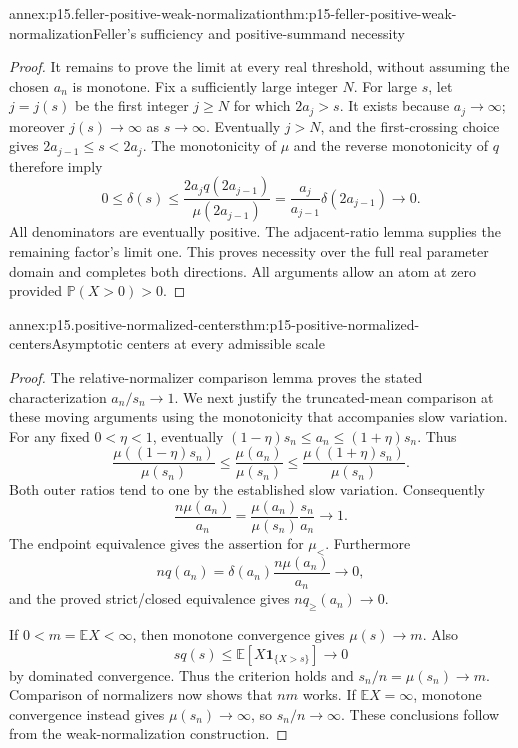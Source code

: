 \begin{annexitem}{annex:p15.feller-positive-weak-normalization}{thm:p15-feller-positive-weak-normalization}{Feller's sufficiency and positive-summand necessity}
\begin{proof}
It remains to prove the limit at every real threshold, without
assuming the chosen \(a_n\) is monotone. Fix a sufficiently large
integer \(N\). For large \(s\), let \(j=j(s)\) be the first
integer \(j\geq N\) for which \(2a_j>s\).
It exists because \(a_j\to\infty\); moreover \(j(s)\to\infty\)
as \(s\to\infty\). Eventually \(j>N\), and the first-crossing
choice gives \(2a_{j-1}\leq s<2a_j\).
The monotonicity of \(\mu\) and the reverse monotonicity of \(q\)
therefore imply
\[
 0\leq\delta(s)
 \leq\frac{2a_j q(2a_{j-1})}{\mu(2a_{j-1})}
 =\frac{a_j}{a_{j-1}}\delta(2a_{j-1})\longrightarrow0.
\]
All denominators are eventually positive. The adjacent-ratio
lemma supplies the remaining factor's limit one. This proves
necessity over the full real parameter domain and completes both
directions. All arguments allow an atom at zero provided
\(\mathbb P(X>0)>0\).
\end{proof}
\end{annexitem}

\begin{annexitem}{annex:p15.positive-normalized-centers}{thm:p15-positive-normalized-centers}{Asymptotic centers at every admissible scale}
\begin{proof}
The relative-normalizer comparison lemma proves the stated
characterization \(a_n/s_n\to1\).
We next justify the truncated-mean comparison at these moving
arguments using the monotonicity that accompanies slow variation.
For any fixed \(0<\eta<1\), eventually
\((1-\eta)s_n\leq a_n\leq(1+\eta)s_n\).
Thus
\[
 \frac{\mu((1-\eta)s_n)}{\mu(s_n)}
 \leq\frac{\mu(a_n)}{\mu(s_n)}
 \leq\frac{\mu((1+\eta)s_n)}{\mu(s_n)}.
\]
Both outer ratios tend to one by the established slow variation.
Consequently
\[
 \frac{n\mu(a_n)}{a_n}
 =\frac{\mu(a_n)}{\mu(s_n)}\frac{s_n}{a_n}\longrightarrow1.
\]
The endpoint equivalence gives the assertion for \(\mu_<\).
Furthermore
\[
 nq(a_n)=\delta(a_n)\frac{n\mu(a_n)}{a_n}\longrightarrow0,
\]
and the proved strict/closed equivalence gives \(nq_{\geq}(a_n)\to0\).

If \(0<m=\mathbb EX<\infty\), then monotone convergence gives
\(\mu(s)\to m\). Also
\[
 s q(s)\leq\mathbb E[X\mathbf1_{\{X>s\}}]\longrightarrow0
\]
by dominated convergence. Thus the criterion holds and
\(s_n/n=\mu(s_n)\to m\).
Comparison of normalizers now shows that \(nm\) works.
If \(\mathbb EX=\infty\), monotone convergence instead gives
\(\mu(s_n)\to\infty\), so \(s_n/n\to\infty\).
These conclusions follow from the weak-normalization construction.
\end{proof}
\end{annexitem}

